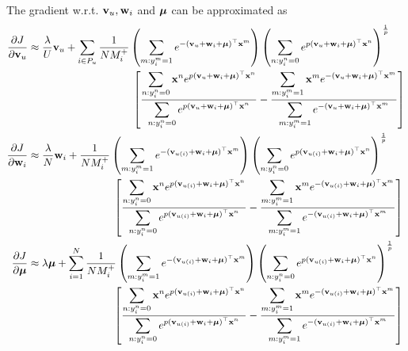 The gradient w.r.t. $\mathbf{v}_u, \mathbf{w}_i$ and $\bm{\mu}$ can be approximated as 
\begin{equation*}
\begin{aligned}
\frac{\partial J}{\partial \bv_u}
&\approx \frac{\lambda}{U} \bv_u
  + \sum_{i \in P_u} \frac{1}{N M_i^+} 
    \left( \sum_{m: y_i^m = 1} e^{-(\bv_u + \w_i + \mubm)^\top \x^m} \right)
    \left( \sum_{n: y_i^n = 0} e^{p (\bv_u + \w_i + \mubm)^\top \x^n} \right)^\frac{1}{p} \\
& \hspace{9.8em} \left[ 
    \frac{ \displaystyle \sum_{n: y_i^n = 0} \x^n e^{p (\bv_u + \w_i + \mubm)^\top \x^n} }
         { \displaystyle \sum_{n: y_i^n = 0} e^{p (\bv_u + \w_i + \mubm)^\top \x^n} }
    - \frac{ \displaystyle \sum_{m: y_i^m = 1} \x^m e^{-(\bv_u + \w_i + \mubm)^\top \x^m} }
           { \displaystyle \sum_{m: y_i^m = 1} e^{-(\bv_u + \w_i + \mubm)^\top \x^m} } \right] \\
%
\frac{\partial J}{\partial \w_i}
&\approx \frac{\lambda}{N} \w_i
  + \frac{1}{N M_i^+} 
    \left( \sum_{m: y_i^m = 1} e^{-(\bv_{u(i)} + \w_i + \mubm)^\top \x^m} \right)
    \left( \sum_{n: y_i^n = 0} e^{p (\bv_{u(i)} + \w_i + \mubm)^\top \x^n} \right)^\frac{1}{p} \\
& \hspace{8em} \left[ 
    \frac{ \displaystyle \sum_{n: y_i^n = 0} \x^n e^{p (\bv_{u(i)} + \w_i + \mubm)^\top \x^n} }
         { \displaystyle \sum_{n: y_i^n = 0} e^{p (\bv_{u(i)} + \w_i + \mubm)^\top \x^n} }
    - \frac{ \displaystyle \sum_{m: y_i^m = 1} \x^m e^{-(\bv_{u(i)} + \w_i + \mubm)^\top \x^m} }
           { \displaystyle \sum_{m: y_i^m = 1} e^{-(\bv_{u(i)} + \w_i + \mubm)^\top \x^m} } \right] \\
%
\frac{\partial J}{\partial \mubm}
&\approx \lambda \mubm
  + \sum_{i=1}^N \frac{1}{N M_i^+} 
    \left( \sum_{m: y_i^m = 1} e^{-(\bv_{u(i)} + \w_i + \mubm)^\top \x^m} \right)
    \left( \sum_{n: y_i^n = 0} e^{p (\bv_{u(i)} + \w_i + \mubm)^\top \x^n} \right)^\frac{1}{p} \\
& \hspace{8em} \left[ 
    \frac{ \displaystyle \sum_{n: y_i^n = 0} \x^n e^{p (\bv_{u(i)} + \w_i + \mubm)^\top \x^n} }
         { \displaystyle \sum_{n: y_i^n = 0} e^{p (\bv_{u(i)} + \w_i + \mubm)^\top \x^n} }
    - \frac{ \displaystyle \sum_{m: y_i^m = 1} \x^m e^{-(\bv_{u(i)} + \w_i + \mubm)^\top \x^m} }
           { \displaystyle \sum_{m: y_i^m = 1} e^{-(\bv_{u(i)} + \w_i + \mubm)^\top \x^m} } \right]
\end{aligned}
\end{equation*}


